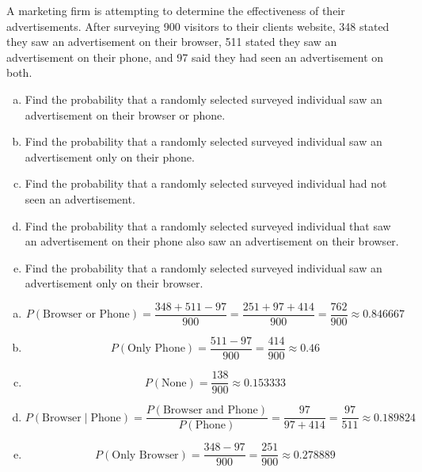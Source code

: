 \documentclass[11pt,letterpaper]{article}
\begin{document}

 A marketing firm is attempting to determine the effectiveness of their advertisements. After surveying 900 visitors to their clients website, 348 stated they saw an advertisement on their browser, 511 stated they saw an advertisement on their phone, and 97 said they had seen an advertisement on both. 
	\begin{enumerate}[(a)]
	\item Find the probability that a randomly selected surveyed individual saw an advertisement on their browser or phone.
	\item Find the probability that a randomly selected surveyed individual saw an advertisement only on their phone.
	\item Find the probability that a randomly selected surveyed individual had not seen an advertisement. 
	\item Find the probability that a randomly selected surveyed individual that saw an advertisement on their phone also saw an advertisement on their browser. 
	\item Find the probability that a randomly selected surveyed individual saw an advertisement only on their browser. 
	\end{enumerate} 

\sol 
\begin{enumerate}[(a)]
\item 
	\[
	P(\text{Browser or Phone})= \dfrac{348 + 511 - 97}{900}= \dfrac{251 + 97 + 414}{900}= \dfrac{762}{900} \approx 0.846667
	\] 

\item 
	\[
	P(\text{Only Phone})= \dfrac{511 - 97}{900}= \dfrac{414}{900} \approx 0.46
	\] 

\item 
	\[
	P(\text{None})= \dfrac{138}{900} \approx 0.153333
	\] 

\item 
	\[
	P(\text{Browser} \;|\; \text{Phone})= \dfrac{P(\text{Browser and Phone})}{P(\text{Phone})}= \dfrac{97}{97 + 414}= \dfrac{97}{511} \approx 0.189824
	\]

\item 
	\[
	P(\text{Only Browser})= \dfrac{348 - 97}{900}= \dfrac{251}{900} \approx 0.278889
	\]
\end{enumerate}
\end{document}
